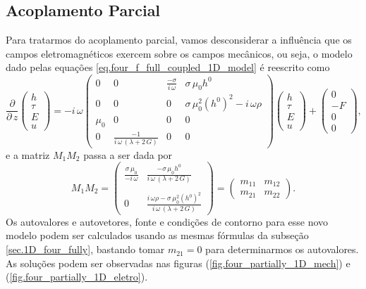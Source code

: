 \subsection{Acoplamento Parcial}
Para tratarmos do acoplamento parcial, vamos desconsiderar a influ\^encia que os campos eletromagn\'eticos exercem sobre os campos mec\^anicos, ou seja, o modelo dado pelas equa\c{c}\~oes \ref{eq.four_f_full_coupled_1D_model} \'e reescrito como
\begin{equation*}
\frac{\partial}{\partial\,z}\begin{pmatrix}
h\\
\tau\\
E\\
u
\end{pmatrix}
=
-i\,\omega\begin{pmatrix}
0&0&\frac{-\sigma}{i\,\omega}&\sigma\,\mu_0h^0\\
0&0&0&\sigma\,\mu_0^2(h^0)^2-i\,\omega\rho\\
\mu_0&0&0&0\\
0&\frac{-1}{i\,\omega\,(\lambda+2\,G)} &0&0
\end{pmatrix}
\begin{pmatrix}
h\\
\tau\\
E\\
u
\end{pmatrix}
+
\begin{pmatrix}
0\\
-F\\
0\\
0
\end{pmatrix},
\end{equation*}
e a matriz $M_1M_2$ passa a ser dada por
\begin{equation*}
M_1M_2=\begin{pmatrix}
\frac{\sigma\,\mu_0}{-i\,\omega}&\frac{-\sigma\,\mu_0h^0}{i\,\omega\,(\lambda+2\,G)}\\\\
0&\frac{i\,\omega\rho-\sigma\,\mu_0^2(h^0)^2}{i\,\omega\,(\lambda+2\,G)}
\end{pmatrix}
=\begin{pmatrix}
m_{11}&m_{12}\\
m_{21}&m_{22}
\end{pmatrix}.
\end{equation*}
Os autovalores e autovetores, fonte e condi\c{c}\~oes de contorno para esse novo modelo podem ser calculados usando as mesmas f\'ormulas da subse\c{c}\~ao \ref{sec.1D_four_fully}, bastando tomar $m_{21}=0$ para determinarmos os autovalores. As solu\c{c}\~oes podem ser observadas nas figuras (\ref{fig.four_partially_1D_mech}) e (\ref{fig.four_partially_1D_eletro}).

